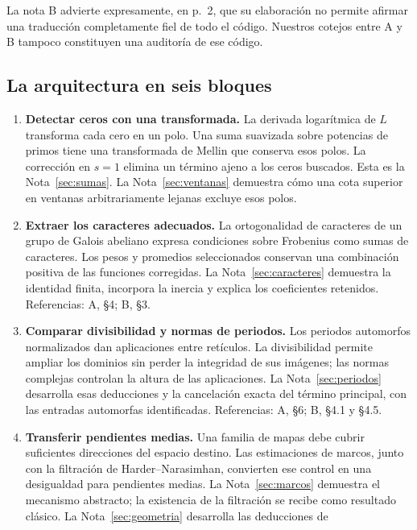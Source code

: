La nota B advierte expresamente, en p.~2, que su elaboración no permite
afirmar una traducción completamente fiel de todo el código. Nuestros
cotejos entre A y B tampoco constituyen una auditoría de ese código.

\subsection{La arquitectura en seis bloques}

\begin{enumerate}[label=\textbf{\arabic*.}]
  \item \textbf{Detectar ceros con una transformada.}
    La derivada logarítmica de $L$ transforma cada cero en un polo.
    Una suma suavizada sobre potencias de primos tiene una transformada de
    Mellin que conserva esos polos. La corrección en $s=1$ elimina un término
    ajeno a los ceros buscados. Esta es la Nota~\ref{sec:sumas}.
    La Nota~\ref{sec:ventanas} demuestra cómo una cota superior en ventanas
    arbitrariamente lejanas excluye esos polos.
  \item \textbf{Extraer los caracteres adecuados.}
    La ortogonalidad de caracteres de un grupo de Galois abeliano expresa
    condiciones sobre Frobenius como sumas de caracteres. Los pesos y
    promedios seleccionados conservan una combinación positiva de las
    funciones corregidas. La Nota~\ref{sec:caracteres} demuestra la identidad
    finita, incorpora la inercia y explica los coeficientes retenidos.
    Referencias: A, §4; B, §3.
  \item \textbf{Comparar divisibilidad y normas de periodos.}
    Los periodos automorfos normalizados dan aplicaciones entre retículos.
    La divisibilidad permite ampliar los dominios sin perder la integridad
    de sus imágenes; las normas complejas controlan la altura de las
    aplicaciones. La Nota~\ref{sec:periodos} desarrolla esas deducciones
    y la cancelación exacta del término principal, con las entradas
    automorfas identificadas. Referencias: A, §6; B, §4.1 y §4.5.
  \item \textbf{Transferir pendientes medias.}
    Una familia de mapas debe cubrir suficientes direcciones del espacio
    destino. Las estimaciones de marcos, junto con la filtración de
    Harder--Narasimhan, convierten ese control en una desigualdad para
    pendientes medias. La Nota~\ref{sec:marcos} demuestra el mecanismo
    abstracto; la existencia de la filtración se recibe como resultado
    clásico. La Nota~\ref{sec:geometria} desarrolla las deducciones de

\end{enumerate}
